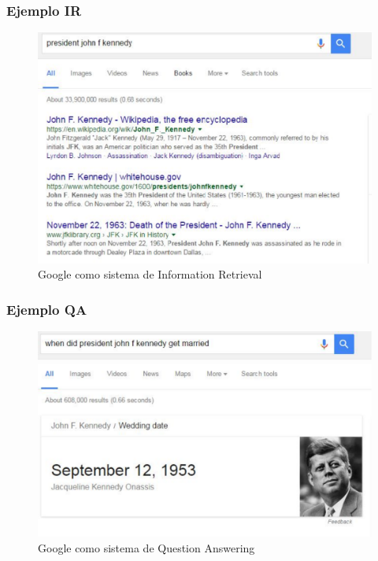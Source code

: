 \begin{frame}
\frametitle{Ejemplo IR}
\begin{figure}
  \centering
    \includegraphics[scale=.35]{graficos/i-r-example}
  \caption{Google como sistema de Information Retrieval}
  \label{fig:qa-example}
\end{figure}
\end{frame}


\begin{frame}
\frametitle{Ejemplo QA}
\begin{figure}
  \centering
    \includegraphics[scale=.5]{graficos/q-a-example}
  \caption{Google como sistema de Question Answering}
  \label{fig:qa-example}
\end{figure}
\end{frame}


